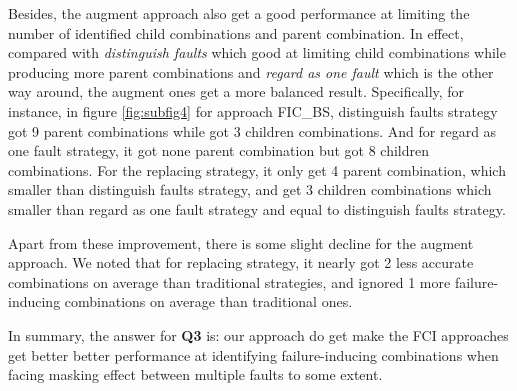 \documentclass{sig-alternate}
\begin{document}
Besides, the augment approach also get a good performance at limiting the number of identified child combinations and parent combination. In effect, compared with \emph{distinguish faults} which good at limiting child combinations while producing more parent combinations and \emph{regard as one fault} which is the other way around, the augment ones get a more balanced result. Specifically, for instance, in figure \ref{fig:subfig4} for approach FIC\_BS, distinguish faults strategy got 9 parent combinations while got 3 children combinations. And for regard as one fault strategy, it got none parent combination but got 8 children combinations. For the replacing strategy, it only get 4 parent combination, which smaller than distinguish faults strategy, and get 3 children combinations which smaller than regard as one fault strategy and equal to distinguish faults strategy.

Apart from these improvement, there is some slight decline for the augment approach. We noted that for replacing strategy, it nearly got 2 less accurate combinations on average than traditional strategies, and ignored 1 more failure-inducing combinations on average than traditional ones.


In summary, the answer for \textbf{Q3} is: our approach do get make the FCI approaches get better better performance at identifying failure-inducing combinations when facing masking effect between multiple faults to some extent.
\end{document}
